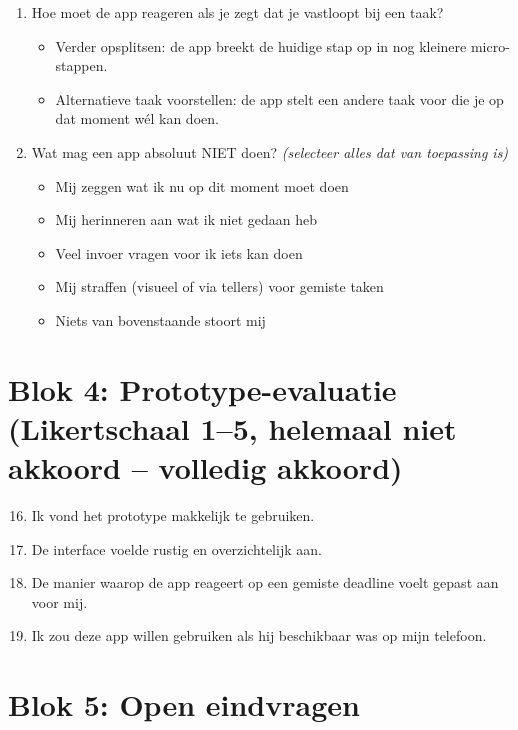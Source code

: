 \begin{enumerate}
\begin{itemize}
    tijden. Jij bepaalt wanneer je wat doet.
  \end{itemize}
  \item Hoe moet de app reageren als je zegt dat je vastloopt bij een taak?
  \begin{itemize}
    \item Verder opsplitsen: de app breekt de huidige stap op in nog
    kleinere micro-stappen.
    \item Alternatieve taak voorstellen: de app stelt een andere taak voor
    die je op dat moment wél kan doen.
  \end{itemize}
  \item Wat mag een app absoluut NIET doen? \textit{(selecteer alles dat van toepassing is)}
  \begin{itemize}
    \item Mij zeggen wat ik nu op dit moment moet doen
    \item Mij herinneren aan wat ik niet gedaan heb
    \item Veel invoer vragen voor ik iets kan doen
    \item Mij straffen (visueel of via tellers) voor gemiste taken
    \item Niets van bovenstaande stoort mij
  \end{itemize}
\end{enumerate}

\section*{Blok 4: Prototype-evaluatie (Likertschaal 1--5, helemaal niet
akkoord -- volledig akkoord)}

\begin{enumerate}
  \setcounter{enumi}{15}
  \item Ik vond het prototype makkelijk te gebruiken.
  \item De interface voelde rustig en overzichtelijk aan.
  \item De manier waarop de app reageert op een gemiste deadline voelt
  gepast aan voor mij.
  \item Ik zou deze app willen gebruiken als hij beschikbaar was op mijn
  telefoon.
\end{enumerate}

\section*{Blok 5: Open eindvragen}

